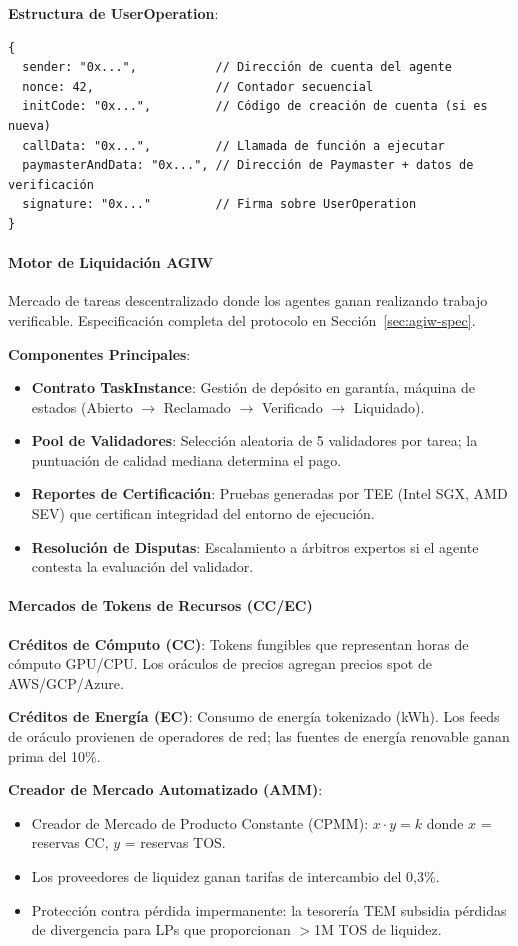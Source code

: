 \documentclass[11pt]{article}
\begin{document}
\textbf{Estructura de UserOperation}:
\begin{verbatim}
{
  sender: "0x...",           // Dirección de cuenta del agente
  nonce: 42,                 // Contador secuencial
  initCode: "0x...",         // Código de creación de cuenta (si es nueva)
  callData: "0x...",         // Llamada de función a ejecutar
  paymasterAndData: "0x...", // Dirección de Paymaster + datos de verificación
  signature: "0x..."         // Firma sobre UserOperation
}
\end{verbatim}

\paragraph{Motor de Liquidación AGIW}
Mercado de tareas descentralizado donde los agentes ganan realizando trabajo verificable. Especificación completa del protocolo en Sección~\ref{sec:agiw-spec}.

\textbf{Componentes Principales}:
\begin{itemize}[noitemsep]
  \item \textbf{Contrato TaskInstance}: Gestión de depósito en garantía, máquina de estados (Abierto $\to$ Reclamado $\to$ Verificado $\to$ Liquidado).
  \item \textbf{Pool de Validadores}: Selección aleatoria de 5 validadores por tarea; la puntuación de calidad mediana determina el pago.
  \item \textbf{Reportes de Certificación}: Pruebas generadas por TEE (Intel SGX, AMD SEV) que certifican integridad del entorno de ejecución.
  \item \textbf{Resolución de Disputas}: Escalamiento a árbitros expertos si el agente contesta la evaluación del validador.
\end{itemize}

\paragraph{Mercados de Tokens de Recursos (CC/EC)}
\textbf{Créditos de Cómputo (CC)}: Tokens fungibles que representan horas de cómputo GPU/CPU. Los oráculos de precios agregan precios spot de AWS/GCP/Azure.

\textbf{Créditos de Energía (EC)}: Consumo de energía tokenizado (kWh). Los feeds de oráculo provienen de operadores de red; las fuentes de energía renovable ganan prima del 10\%.

\textbf{Creador de Mercado Automatizado (AMM)}:
\begin{itemize}[noitemsep]
  \item Creador de Mercado de Producto Constante (CPMM): $x \cdot y = k$ donde $x$ = reservas CC, $y$ = reservas TOS.
  \item Los proveedores de liquidez ganan tarifas de intercambio del 0,3\%.
  \item Protección contra pérdida impermanente: la tesorería TEM subsidia pérdidas de divergencia para LPs que proporcionan $>$1M TOS de liquidez.
\end{itemize}
\end{document}
